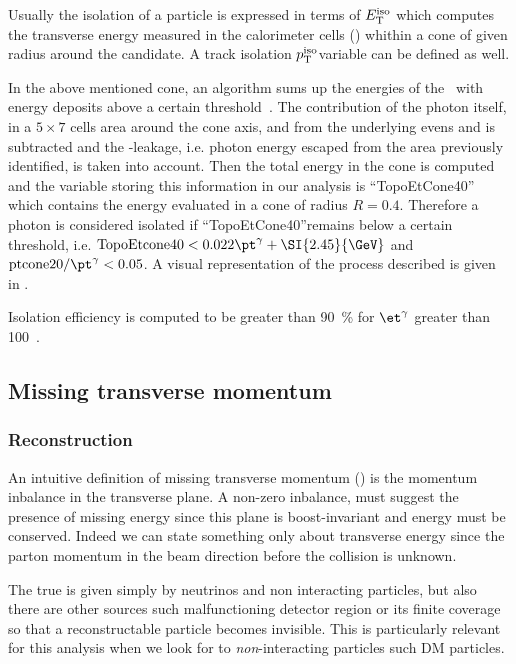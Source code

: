 Usually the isolation of a particle is expressed in terms of $E_\textup{T}^{\textup{iso}}$ which computes the transverse energy measured in the calorimeter cells (\topo) whithin a cone of given radius around the candidate. A track isolation $p_\textup{T}^{\textup{iso}}$variable can be defined as well.

In the above mentioned cone, an algorithm sums up the energies of the \topo~with energy deposits above a certain threshold~\cite{photonsISO}. The contribution of the photon itself, in a $5\times7$ cells area around the cone axis, and from the underlying evens and \pileup is  subtracted and the \pt-leakage, i.e. photon energy escaped from the area previously identified, is taken into account. Then the total energy in the cone is computed and the variable storing this information in our analysis is ``TopoEtCone40'' which contains the energy evaluated in a cone of radius $R=0.4$. Therefore a photon is considered isolated if ``TopoEtCone40''remains below a certain threshold, i.e. $\text{TopoEtcone40} < 0.022\pt^\gamma + \SI{2.45}{\GeV}$ and $\text{ptcone20}/\pt^\gamma<0.05$. A visual representation of the process described is given in \Fig{\ref{topoetcone40}}.

Isolation efficiency is computed to be greater than \SI{90}{\percent} for $\et^\gamma$ greater than \SI{100}{\gev}~\cite{photonsISO}.


\subsection{Missing transverse momentum}
\label{sec:met}
\subsubsection{Reconstruction}

An intuitive definition of missing transverse momentum (\met) is the momentum inbalance in the transverse plane. A non-zero inbalance, must suggest the presence of missing energy since this plane is boost-invariant and energy must be conserved. Indeed we can state something only about transverse energy since the parton momentum in the beam direction before the collision is unknown.

The true \met is given simply by neutrinos and non interacting particles, but also there are other sources such malfunctioning detector region or its finite coverage so that a reconstructable particle becomes invisible. This is particularly relevant for this analysis when we look for to \emph{non}-interacting particles such DM particles.

